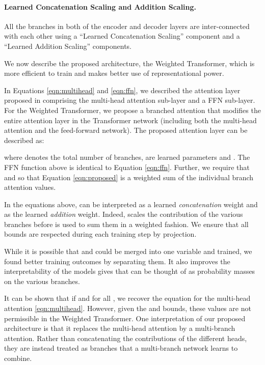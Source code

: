 \documentclass{article} \usepackage{iclr2018_conference,times}
\newcommand{\name}{Weighted Transformer\xspace}
\begin{document}
\paragraph{Learned Concatenation Scaling and Addition Scaling.} All the branches in both of the encoder and decoder layers are inter-connected with each other using a ``Learned Concatenation Scaling'' component and a ``Learned Addition Scaling'' components. 
\fi

{We now describe the proposed architecture, the \name, which is more efficient to train and makes better use of representational power. 


In Equations \eqref{eqn:multihead} and \eqref{eqn:ffn}, we described the attention layer proposed in \citet{vaswani2017attention} comprising the multi-head attention sub-layer and a FFN sub-layer. For the \name, we propose a branched attention that modifies the entire attention layer in the Transformer network (including both the multi-head attention and the feed-forward network). The proposed attention layer can be described as:
 
where  denotes the total number of branches,  are learned parameters and .  The FFN function above is identical to Equation \eqref{eqn:ffn}. Further, we require that  and  so that Equation \eqref{eqn:proposed} is a weighted sum of the individual branch attention values. 

In the equations above,  can be interpreted as a learned \textit{concatenation} weight and  as the learned \textit{addition} weight. Indeed,  scales the contribution of the various branches before  is used to sum them in a weighted fashion. We ensure that all bounds are respected during each training step by projection.

While it is possible that  and  could be merged into one variable and trained, we found better training outcomes by separating them. It also improves the interpretability of the models gives that  can be thought of as probability masses on the various branches. 

It can be shown that if  and  for all , we recover the equation for the multi-head attention \eqref{eqn:multihead}. However, given the  and  bounds, these values are not permissible in the \name. One interpretation of our proposed architecture is that it replaces the multi-head attention by a multi-branch attention. Rather than concatenating the contributions of the different heads, they are instead treated as branches that a multi-branch network learns to combine.

}
\end{document}
